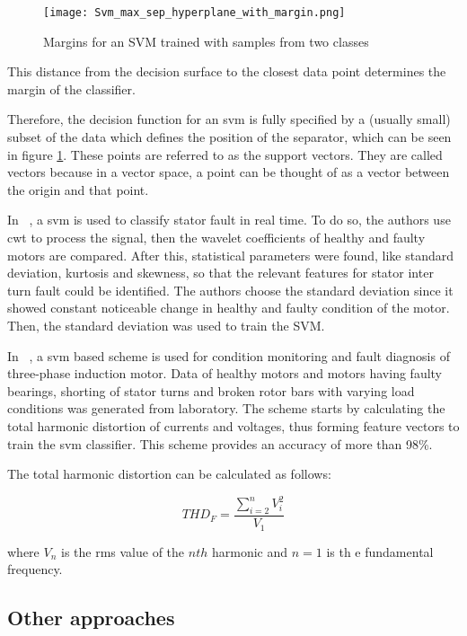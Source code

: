 \begin{figure}[htpb]
\centering
\texttt{[image: Svm\_max\_sep\_hyperplane\_with\_margin.png]}
\caption{Margins for an SVM trained with samples from two classes}
\label{fig:svm_margin}
\end{figure}

This distance from the decision surface to the closest data point determines the margin of the classifier.

Therefore, the decision function for an \Acrshort{svm} is fully specified by a (usually small) subset of the data which defines the position of the separator, which can be seen in figure \ref{fig:svm_margin}. These points are referred to as the support vectors. They are called vectors because in a vector space, a point can be thought of as a vector between the origin and that point.


In ~\cite{Jagadanand2015}, a \Acrshort{svm} is used to classify stator fault in real time. To do so, the authors use \acrfull{cwt} to process the signal, then the wavelet coefficients of healthy and faulty motors are compared. After this, statistical parameters were found, like standard deviation, kurtosis and skewness, so that the relevant features for stator inter turn fault could be identified. The authors choose the standard deviation since it showed constant noticeable change in healthy and faulty condition of the motor. Then, the standard deviation was used to train the SVM.


In ~\cite{Patel2016}, a \Acrshort{svm} based scheme is used for condition monitoring and fault diagnosis of three-phase induction motor. Data of healthy motors and motors having faulty bearings, shorting of stator turns and broken rotor bars with varying load conditions was generated from laboratory. The scheme starts by calculating the total harmonic distortion of currents and voltages, thus forming feature vectors to train the \Acrshort{svm} classifier. This scheme provides an accuracy of more than 98\%.

The total harmonic distortion can be calculated as follows:

\begin{equation} 
\label{eq:total_harmornic_distortion}
THD_F = \frac{\sum_{i=2}^{n} V_i^2}{V_1}  
\end{equation}

\noindent where $V_n$ is the \acrshort{rms} value of the $nth$ harmonic and $n=1$ is th e fundamental frequency.

\subsection{Other approaches} %
\label{sec:other_approaches}


